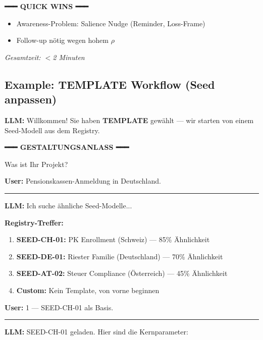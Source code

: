 \begin{tcolorbox}[colback=green!5!white, colframe=green!75!black,
    title=Example: SCHNELL Model Design (3 Questions), breakable]
{{\textbf{━━━ QUICK WINS ━━━}
\begin{itemize}[nosep]
\item Awareness-Problem: Salience Nudge (Reminder, Loss-Frame)
\item Follow-up nötig wegen hohem $\rho$
\end{itemize}
}}

\vspace{0.3em}
\textit{Gesamtzeit: $<$2 Minuten}
\end{tcolorbox}

\subsection{Example: TEMPLATE Workflow (Seed anpassen)}

\begin{tcolorbox}[colback=orange!5!white, colframe=orange!75!black,
    title=Example: TEMPLATE Model Design (Start from Seed), breakable]
\small
\textbf{LLM:} Willkommen! Sie haben \textbf{TEMPLATE} gewählt --- wir starten
von einem Seed-Modell aus dem Registry.

\vspace{0.3em}
\textbf{━━━ GESTALTUNGSANLASS ━━━}
\vspace{0.3em}

Was ist Ihr Projekt?

\textbf{User:} Pensionskassen-Anmeldung in Deutschland.

\hrule
\vspace{0.3em}

\textbf{LLM:} Ich suche ähnliche Seed-Modelle...

\textbf{Registry-Treffer:}
\begin{enumerate}
\item \textbf{SEED-CH-01:} PK Enrollment (Schweiz) --- 85\% Ähnlichkeit
\item \textbf{SEED-DE-01:} Riester Familie (Deutschland) --- 70\% Ähnlichkeit
\item \textbf{SEED-AT-02:} Steuer Compliance (Österreich) --- 45\% Ähnlichkeit
\item \textbf{Custom:} Kein Template, von vorne beginnen
\end{enumerate}

\textbf{User:} 1 --- SEED-CH-01 als Basis.

\hrule
\vspace{0.3em}

\textbf{LLM:} SEED-CH-01 geladen. Hier sind die Kernparameter:


\end{tcolorbox}
